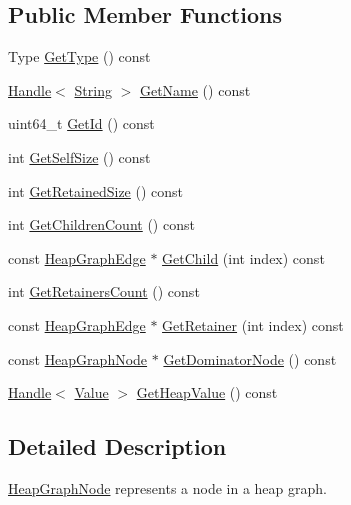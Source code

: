 \subsection*{Public Member Functions}
\begin{DoxyCompactItemize}
\item 
Type \hyperlink{classv8_1_1_heap_graph_node_a5e07fc855bded52229e62b855fa08c5d}{Get\+Type} () const 
\item 
\hyperlink{classv8_1_1_handle}{Handle}$<$ \hyperlink{classv8_1_1_string}{String} $>$ \hyperlink{classv8_1_1_heap_graph_node_af5f24ee6c07a57814e18bd317cb5576a}{Get\+Name} () const 
\item 
uint64\+\_\+t \hyperlink{classv8_1_1_heap_graph_node_a400431a5073604742b13372ad901bd78}{Get\+Id} () const 
\item 
int \hyperlink{classv8_1_1_heap_graph_node_acd3bd8860aa399ac56fa8a0229af7b85}{Get\+Self\+Size} () const 
\item 
int \hyperlink{classv8_1_1_heap_graph_node_a92482dde4fecae71759bfc5c2cfc4c43}{Get\+Retained\+Size} () const 
\item 
int \hyperlink{classv8_1_1_heap_graph_node_a0a49abe006755dd5536d15ae42f552d4}{Get\+Children\+Count} () const 
\item 
const \hyperlink{classv8_1_1_heap_graph_edge}{Heap\+Graph\+Edge} $\ast$ \hyperlink{classv8_1_1_heap_graph_node_ac3435611573e58b6614aeaab68442905}{Get\+Child} (int index) const 
\item 
int \hyperlink{classv8_1_1_heap_graph_node_a9de00d0733343b4b16823654813c22a1}{Get\+Retainers\+Count} () const 
\item 
const \hyperlink{classv8_1_1_heap_graph_edge}{Heap\+Graph\+Edge} $\ast$ \hyperlink{classv8_1_1_heap_graph_node_a260c115d00b7960a08ea34c6a8bee058}{Get\+Retainer} (int index) const 
\item 
const \hyperlink{classv8_1_1_heap_graph_node}{Heap\+Graph\+Node} $\ast$ \hyperlink{classv8_1_1_heap_graph_node_abdb4f9cb4fc89f5b65d3a499a6748fa7}{Get\+Dominator\+Node} () const 
\item 
\hyperlink{classv8_1_1_handle}{Handle}$<$ \hyperlink{classv8_1_1_value}{Value} $>$ \hyperlink{classv8_1_1_heap_graph_node_a721db273c266c30d7a79a40a212aeab5}{Get\+Heap\+Value} () const 
\end{DoxyCompactItemize}


\subsection{Detailed Description}
\hyperlink{classv8_1_1_heap_graph_node}{Heap\+Graph\+Node} represents a node in a heap graph. 

